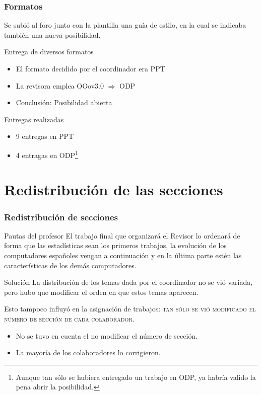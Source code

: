 \documentclass[9pt,xcolor=svgnames]{beamer}
\begin{document}
 \begin{frame}
  \frametitle{Formatos}

  \transdissolve
  
  \noindent  Se subió al foro junto con la plantilla una guía de estilo, en 
  la cual se indicaba también una nueva posibilidad.
  
  \begin{block}{Entrega de diversos formatos}
  \begin{itemize}
    \item El formato decidido por el coordinador era PPT
    \item La revisora emplea OOov3.0 $\Longrightarrow$ ODP
    \item Conclusión: Posibilidad abierta
  \end{itemize}
  \end{block}
  
  \begin{block}{Entregas realizadas}
  \begin{itemize}
    \item 9 entregas en PPT
    \item 4 entragas en ODP\footnote{Aunque tan sólo se hubiera entregado
    un trabajo en ODP, ya habría valido la pena abrir la posibilidad.}
  \end{itemize}
  \end{block} 
 
  \end{frame}
  
  
  \section{Redistribución de las secciones}
    \transboxin
    
  \begin{frame}
   \frametitle{Redistribución de secciones}
 
    \begin{block}{Pautas del profesor}
     El trabajo final que organizará el Revisor lo ordenará de forma que las
     estadísticas sean los primeros trabajos, la evolución de los 
     computadores españoles vengan a continuación y en la última parte 
     estén las características de los demás computadores.
    \end{block}
  
  \begin{block}{Solución}
   La distribución de los temas dada por el coordinador no se vió variada, 
   pero hubo que modificar el orden en que estos temas aparecen.
  
   Esto tampoco influyó en la asignación de trabajos:
   \textsc{tan sólo se vió modificado el número de sección de cada 
   colaborador}.
  
   \begin{itemize}
     \item No se tuvo en cuenta el no modificar el número de sección.
     \item La mayoría de los colaboradores lo corrigieron.
   \end{itemize}
  \end{block}
  
  \end{frame}
 
\end{document}
